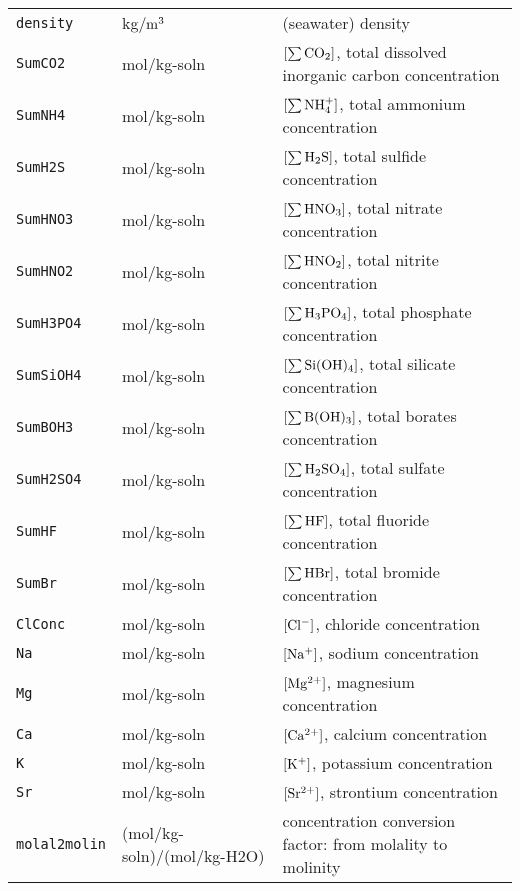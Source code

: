 \documentclass[article,nojss]{jss}
\begin{document}
\begin{footnotesize}
\begin{longtable}{l|l|p{7cm}}
\texttt{density}     & kg/$\rm m^3$                 & (seawater) density   \\
\texttt{SumCO2}      & mol/kg-soln                  & $[\rm \sum CO_2]$, total dissolved inorganic carbon concentration \\         
\texttt{SumNH4}      & mol/kg-soln                  & $[\rm \sum NH_4^+]$, total ammonium concentration\\
\texttt{SumH2S}      & mol/kg-soln                  & $[\rm \sum H_2S]$, total sulfide concentration\\
\texttt{SumHNO3}     & mol/kg-soln                  & $[\rm \sum HNO_3]$, total nitrate concentration\\
\texttt{SumHNO2}     & mol/kg-soln                  & $[\rm \sum HNO_2]$, total nitrite concentration\\
\texttt{SumH3PO4}    & mol/kg-soln                  & $[\rm \sum H_3PO_4]$, total phosphate concentration\\
\texttt{SumSiOH4}    & mol/kg-soln                  & $[\rm \sum Si(OH)_4]$, total silicate concentration\\       
\texttt{SumBOH3}     & mol/kg-soln                  & $[\rm \sum B(OH)_3]$, total borates concentration\\
\texttt{SumH2SO4}    & mol/kg-soln                  & $[\rm \sum H_2SO_4]$, total sulfate concentration\\
\texttt{SumHF}       & mol/kg-soln                  & $[\rm \sum HF]$, total fluoride concentration\\
\texttt{SumBr}       & mol/kg-soln                  & $[\rm \sum HBr]$, total bromide concentration\\
\texttt{ClConc}      & mol/kg-soln                  & $[\rm Cl^-]$, chloride concentration\\
\texttt{Na}          & mol/kg-soln                  & $[\rm Na^{+}]$, sodium concentration\\
\texttt{Mg}          & mol/kg-soln                  & $[\rm Mg^{2+}]$, magnesium concentration\\
\texttt{Ca}          & mol/kg-soln                  & $[\rm Ca^{2+}]$, calcium concentration\\
\texttt{K}           & mol/kg-soln                  & $[\rm K^+]$, potassium concentration\\               
\texttt{Sr}          & mol/kg-soln                  & $[\rm Sr^{2+}]$, strontium concentration\\    
\texttt{molal2molin} & (mol/kg-soln)/(mol/kg-H2O)   & concentration conversion factor: from molality to molinity\\

\end{longtable}
\end{footnotesize}
\end{document}
